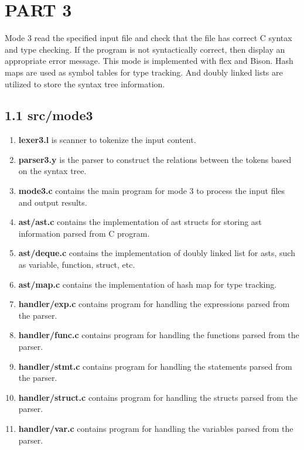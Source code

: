 \section*{PART 3}

Mode 3 read the specified input file and check that the file has correct C syntax and type checking. If the program is not syntactically correct, then display an appropriate error message. This mode is implemented with flex and Bison. Hash maps are used as symbol tables for type tracking. And doubly linked lists are utilized to store the syntax tree information.

\subsection*{1.1 \large\textbf{src/mode3}}
\begin{enumerate}
    \item \textbf{lexer3.l} is scanner to tokenize the input content.

    \item \textbf{parser3.y} is the parser to construct the relations between the tokens based on the syntax tree.
    
    \item \textbf{mode3.c} contains the main program for mode 3 to process the input files and output results.

    \item \textbf{ast/ast.c} contains the implementation of ast structs for storing ast information parsed from C program.

    \item \textbf{ast/deque.c} contains the implementation of doubly linked list for asts, such as variable, function, struct, etc.
    \item \textbf{ast/map.c} contains the implementation of hash map for type tracking.
    \item \textbf{handler/exp.c} contains program for handling the expressions parsed from the parser.
    \item \textbf{handler/func.c} contains program for handling the functions parsed from the parser.
    \item \textbf{handler/stmt.c} contains program for handling the statements parsed from the parser.
    \item \textbf{handler/struct.c} contains program for handling the structs parsed from the parser.
    \item \textbf{handler/var.c} contains program for handling the variables parsed from the parser.
\end{enumerate}

